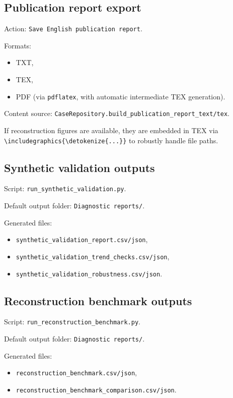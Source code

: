 \documentclass[12pt,a4paper]{article}
\begin{document}
\subsection{Publication report export}
Action: \texttt{Save English publication report}.

Formats:
\begin{itemize}
    \item TXT,
    \item TEX,
    \item PDF (via \texttt{pdflatex}, with automatic intermediate TEX generation).
\end{itemize}

Content source: \texttt{CaseRepository.build\_publication\_report\_text/tex}.

If reconstruction figures are available, they are embedded in TEX via
\texttt{\textbackslash includegraphics\{\textbackslash detokenize\{...\}\}} to robustly handle file paths.

\subsection{Synthetic validation outputs}
Script: \texttt{run\_synthetic\_validation.py}.

Default output folder: \texttt{Diagnostic reports/}.

Generated files:
\begin{itemize}
    \item \texttt{synthetic\_validation\_report.csv/json},
    \item \texttt{synthetic\_validation\_trend\_checks.csv/json},
    \item \texttt{synthetic\_validation\_robustness.csv/json}.
\end{itemize}

\subsection{Reconstruction benchmark outputs}
Script: \texttt{run\_reconstruction\_benchmark.py}.

Default output folder: \texttt{Diagnostic reports/}.

Generated files:
\begin{itemize}
    \item \texttt{reconstruction\_benchmark.csv/json},
    \item \texttt{reconstruction\_benchmark\_comparison.csv/json}.
\end{itemize}
\end{document}
